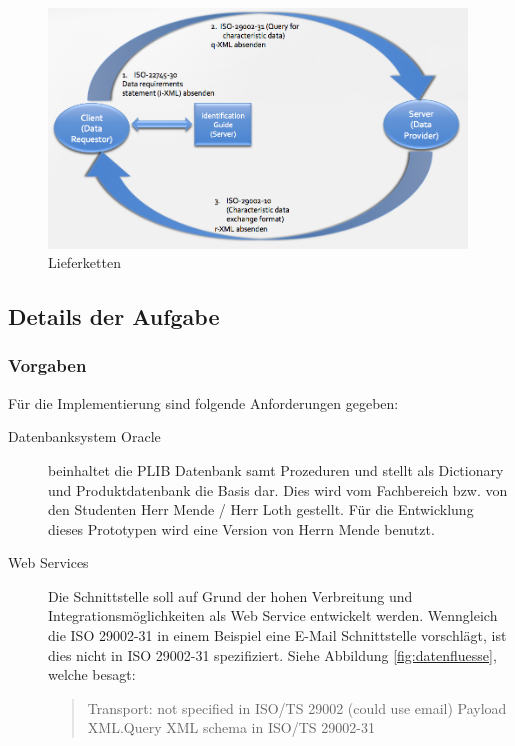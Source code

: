 \begin{figure}[htbp]
	\centering
		\includegraphics[width=0.99\textwidth]{images/lieferketten_plib.png}
		\caption[Lieferketten]{Lieferketten\footnotemark}
	\label{fig:lieferketten}
\end{figure}

\subsection{Details der Aufgabe}

\subsubsection{Vorgaben}

Für die Implementierung sind folgende Anforderungen gegeben:
\begin{description}
\item[Datenbanksystem Oracle] beinhaltet die PLIB Datenbank samt Prozeduren und stellt als Dictionary und Produktdatenbank die Basis dar. Dies wird vom Fachbereich bzw. von den Studenten Herr Mende / Herr Loth gestellt. Für die Entwicklung dieses Prototypen wird eine Version von Herrn Mende benutzt. 
\item[Web Services] Die Schnittstelle soll auf Grund der hohen Verbreitung und Integrationsmöglichkeiten als Web Service entwickelt werden. Wenngleich die ISO 29002-31 in einem Beispiel eine E-Mail Schnittstelle vorschlägt, ist dies nicht in ISO 29002-31 spezifiziert. Siehe Abbildung \ref{fig:datenfluesse}, welche besagt:
\begin{quotation}
Transport: not specified in ISO/TS 29002 (could use email) Payload XML.Query XML schema in ISO/TS 29002-31
\end{quotation}
\end{description}

